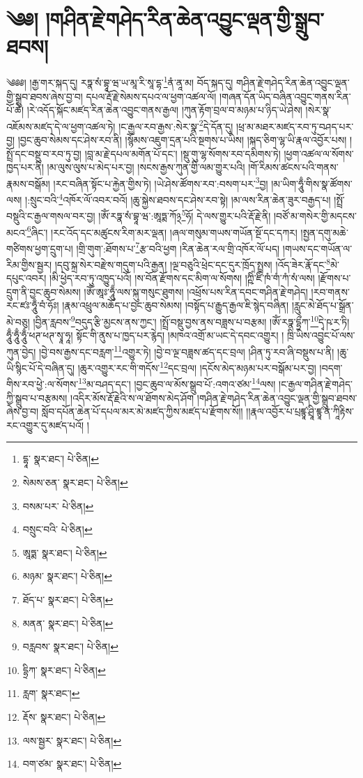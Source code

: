 \setcounter{footnote}{0} 
\chapter{༄༅། །གཤིན་རྗེ་གཤེད་རིན་ཆེན་འབྱུང་ལྡན་གྱི་སྒྲུབ་ཐབས།}༄༅༅། །རྒྱ་གར་སྐད་དུ། རཏྣ་སཾ་བྷཱ་ཝ་ཡ་མཱ་རི་སཱ་དྷ་\footnote{དྷཱ་  སྣར་ཐང་།  པེ་ཅིན། }ནཾ་ནཱ་མ། བོད་སྐད་དུ། གཤིན་རྗེ་གཤེད་རིན་ཆེན་འབྱུང་ལྡན་གྱི་སྒྲུབ་ཐབས་ཞེས་བྱ་བ། དཔལ་རྡོ་རྗེ་སེམས་དཔའ་ལ་ཕྱག་འཚལ་ལོ། །གཞན་དོན་ཡིད་བཞིན་འབྱུང་གནས་རིན་པོ་ཆེ། །རེ་འདོད་སྐོང་མཛད་རིན་ཆེན་འབྱུང་གནས་རྒྱལ། །ཀུན་རྟོག་བྲལ་བ་མཉམ་པ་ཉིད་ཡེ་ཤེས། །སེར་སྣ་འཇོམས་མཛད་དེ་ལ་ཕྱག་འཚལ་ཏེ། །ང་རྒྱལ་རབ་རྒྱས་:སེར་སྣ་\footnote{སེམས་ཅན་  སྣར་ཐང་།  པེ་ཅིན། }དེ་དོན་དུ། །ཕྲ་མ་མཐར་མཛད་རབ་ཏུ་བཤད་པར་བྱ། །བྱང་ཆུབ་སེམས་དང་ཤེས་རབ་ནི། །སྙོམས་འཇུག་དྲན་པའི་སྔགས་པ་ཡིས། །སྐད་ཅིག་ལྷ་ཡི་རྣལ་འབྱོར་པས། །སྤྲོ་དང་བསྡུ་བ་རབ་ཏུ་བྱ། །བླ་མ་རྗེ་དཔལ་མགོན་པོ་དང་། །སྡུ་གུ་ལྷ་སོགས་རབ་དམིགས་ཏེ། །ཕྱག་འཚལ་ལ་སོགས་ཁྱད་པར་ནི། །མ་ལུས་ལུས་པ་མེད་པར་བྱ། །སངས་རྒྱས་ཀུན་གྱི་ལམ་གྱུར་པའི། །གོ་རིམས་ཚངས་པའི་གནས་རྣམས་བསྒོམ། །རང་བཞིན་སྟོང་པ་རྐྱེན་གྱིས་ཏེ། །ཡེ་ཤེས་ཚོགས་རབ་:བསག་པར་\footnote{བསམ་པར་  པེ་ཅིན། }བྱ། །མ་ཡིག་ཧཱུྃ་གིས་སྣ་ཚོགས་ལས། །:སྲུང་བའི་\footnote{བསྲུང་བའི་  པེ་ཅིན། }འཁོར་ལོ་འབར་བའོ། །ཆུ་སྐྱེས་ཐབས་དང་ཤེས་རབ་སྟེ། །མ་ལས་རིན་ཆེན་ཟུར་བརྒྱད་པ། །སྤྲོ་བསྡུའི་ང་རྒྱལ་གསལ་བར་བྱ། །ཨོཾ་རཏྣ་སཾ་བྷཱ་ཝ་:ཨཱཏྨ་ཀོ྅\footnote{ཨཱཏྨ་  སྣར་ཐང་།  པེ་ཅིན། }ཧོ། དེ་ལས་གྱུར་པའི་རྡོ་རྗེ་ནི། །བཙོ་མ་གསེར་གྱི་མདངས་མངའ་\footnote{མཉམ་  སྣར་ཐང་།  པེ་ཅིན། }ཞིང་། །རང་འོད་དང་མཚུངས་རིག་མར་ལྡན། །ཞལ་གསུམ་གཡས་གཡོན་སྔོ་དང་དཀར། །སྤྱན་དགུ་མཆེ་གཙིགས་ཕྱག་དྲུག་པ། །གྲི་གུག་:ཐོགས་པ་\footnote{ཐོད་པ་  སྣར་ཐང་།  པེ་ཅིན། }རྩ་བའི་ཕྱག །རིན་ཆེན་རལ་གྲི་འཁོར་ལོ་པད། །གཡས་དང་གཡོན་ལ་རིམ་གྱིས་སྦྱར། །དབུ་སྐྲ་སེར་བརྫེས་གདུག་པའི་རྒྱན། །ལྔ་བཅུའི་ཕྲེང་དང་དུར་ཁྲོད་སྤྲས། །འོད་ཟེར་རྣོ་དང་\footnote{མནན་  སྣར་ཐང་།  པེ་ཅིན། }མེ་དཔུང་འབར། །མི་ཕྱེད་རབ་ཏུ་འཁྱུད་པའོ། །ས་བོན་རྫོགས་དང་མིག་ལ་སོགས། །ཀྵིཾ་ཛིཾ་ཁཾ་གཾ་ཀཾ་སཾ་ལས། །རྫོགས་པ་དྲུག་ནི་བྱང་ཆུབ་སེམས། །ཨོཾ་ཨཱཿ་ཧཱུྃ་ལས་སྐུ་གསུང་ཐུགས། །འཕྲོས་པས་རིན་དབང་གཤིན་རྗེ་གཤེད། །རབ་གནས་རང་ཛཿ་ཧཱུྃ་བཾ་ཧོཿ། །རྣམ་འཕྲུལ་མཆོད་པ་བྱང་ཆུབ་སེམས། །བསྟོད་པ་རྒྱུད་རྒྱལ་ཇི་སྙེད་བཞིན། །རླུང་མེ་ཐོད་པ་སྒྲོན་མེ་བཅུ། །བྱིན་རླབས་\footnote{བརླབས་  སྣར་ཐང་།  པེ་ཅིན། }བདུད་རྩི་མྱངས་ནས་ཀྱང་། །སྤྲོ་བསྡུ་བྱས་ནས་བཟླས་པ་བརྩམ། །ཨོཾ་རཏྣ་དྷྲྀཀ་\footnote{དྷྲིཀ་  སྣར་ཐང་།  པེ་ཅིན། }དྭེ་ཥ་ར་ཏི། ཧཱུྃ་ཧཱུྃ་ཧཱུྃ་ཕཊ་ཕཊ་སྭཱ་ཧཱ། སྟོང་གི་ནུས་པ་ཁྱད་པར་རྙེད། །མཁའ་འགྲོ་མ་ཡང་དེ་དབང་འགྱུར། །
ཁྲི་ཡིས་འབྱུང་པོ་ལས་ཀུན་བྱེད། །བྱེ་བས་རྒྱས་དང་བརླག་\footnote{རླག་  སྣར་ཐང་། }འགྱུར་ཏེ། །བྱེ་བ་ལྔ་བཟླས་ཚད་དང་བྲལ། །ཤིན་ཏུ་རབ་ཞི་བསྡུས་པ་ནི། །ཆུ་ཡི་སྙིང་པོ་དེ་བཞིན་དུ། །ཆུར་འགྱུར་རང་གི་གདོས་\footnote{རྡོས་  སྣར་ཐང་།  པེ་ཅིན། }དང་བྲལ། །དངོས་མེད་མཉམ་པར་བསྒོམ་པར་བྱ། །བདག་གིས་རབ་ཕྱེ་:ལ་སོགས་\footnote{ལས་སྦྱར་  སྣར་ཐང་།  པེ་ཅིན། }མ་བཤད་དང་། །བྱང་ཆུབ་ལ་མོས་སྒྲུབ་པོ་:འགའ་ཙམ་\footnote{བག་ཙམ་  སྣར་ཐང་།  པེ་ཅིན། }ལས། །ང་རྒྱལ་གཤིན་རྗེ་གཤེད་ཀྱི་སྒྲུབ་པ་བརྩམས། །འདིར་མོས་རྡོ་རྗེའི་ས་ལ་ཐོགས་མེད་ཤོག །གཤིན་རྗེ་གཤེད་རིན་ཆེན་འབྱུང་ལྡན་གྱི་སྒྲུབ་ཐབས་ཞེས་བྱ་བ། སློབ་དཔོན་ཆེན་པོ་དཔལ་མར་མེ་མཛད་ཀྱིས་མཛད་པ་རྫོགས་སོ།། །།རྣལ་འབྱོར་པ་པྲཛྙཱ་ཤྲཱི་ཛྙཱ་ན་ཀཱིརྟིས་རང་འགྱུར་དུ་མཛད་པའོ། ། 